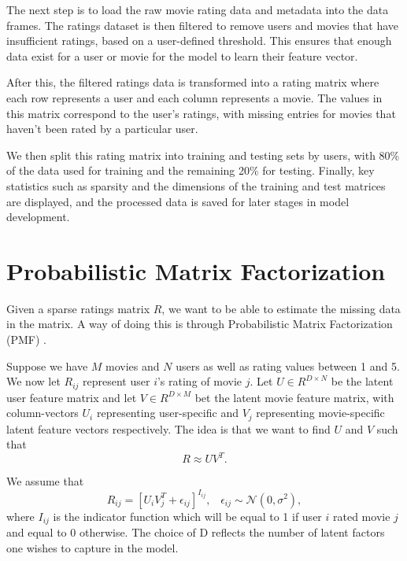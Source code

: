 \documentclass{article}
\begin{document}
The next step is to load the raw movie rating data and metadata into the data frames. The ratings dataset is then filtered to remove users and movies that have insufficient ratings, based on a user-defined threshold. This ensures that enough data exist for a user or movie for the model to learn their feature vector.

After this, the filtered ratings data is transformed into a rating matrix where each row represents a user and each column represents a movie. The values in this matrix correspond to the user's ratings, with missing entries for movies that haven’t been rated by a particular user.

We then split this rating matrix into training and testing sets by users, with 80\% of the data used for training and the remaining 20\% for testing. Finally, key statistics such as sparsity and the dimensions of the training and test matrices are displayed, and the processed data is saved for later stages in model development.


\section{Probabilistic Matrix Factorization}

Given a sparse ratings matrix $R$, we want to be able to estimate the missing data in the matrix. A way of doing this is through Probabilistic Matrix Factorization (PMF) \cite{salakhutdinov2007}.

Suppose we have $M$ movies and $N$ users as well as rating values between 1 and 5. We now let $R_ {ij}$ represent user $i$'s rating of movie $j$. Let $U \in R^{D \times N}$ be the latent user feature matrix and let $V \in R^{D \times M}$ bet the latent movie feature matrix, with column-vectors $U_i$ representing user-specific and $V_j$ representing movie-specific latent feature vectors respectively. The idea is that we want to find $U$ and $V$ such that
\begin{equation}
    R \approx UV^T.
\end{equation}

We assume that
\begin{equation}
    R_{ij} = [U_iV_j^T + \epsilon_{ij}]^{I_{ij}}, \;\;\; \epsilon_{ij} \sim \mathcal{N}(0, \sigma^2),
\end{equation}
where $I_{ij}$ is the indicator function which will be equal to 1 if user $i$ rated movie $j$ and equal to 0 otherwise. The choice of D reflects the number of latent factors one wishes to capture in the model.
\end{document}
